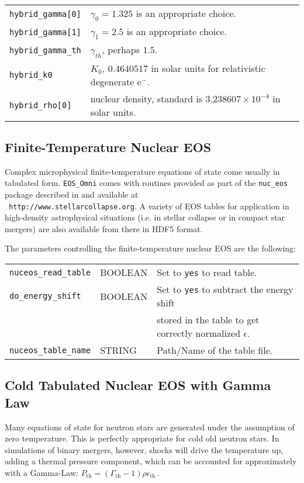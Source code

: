 \begin{tabular}{ll}
\texttt{hybrid\_gamma[0]}   & $\gamma_0 = 1.325$ is an appropriate choice.\\
\texttt{hybrid\_gamma[1]}   & $\gamma_1 = 2.5$ is an appropriate choice.\\
\texttt{hybrid\_gamma\_th}  & $\gamma_{th}$, perhaps $1.5$.\\
\texttt{hybrid\_k0}         & $K_0$, $0.4640517$ in solar units for
                              relativistic degenerate e$^{-}$.\\
\texttt{hybrid\_rho[0]}     & nuclear density, standard is $3.238607\times
                              10^{-4}$ in solar units.
\end{tabular}


\subsection{Finite-Temperature Nuclear EOS}

Complex microphysical finite-temperature equations of state come
usually in tabulated form. {\tt EOS\_Omni} comes with routines
provided as part of the \texttt{nuc\_eos} package described in
\cite{oconnor:10} and available at \\ {\tt
  http://www.stellarcollapse.org}. A variety of EOS tables for
application in high-density astrophysical situations (i.e. in stellar
collapse or in compact star mergers) are also available from there
in HDF5 format.

The parameters controlling the finite-temperature nuclear EOS
are the following:

\begin{tabular}{lll}
\texttt{nuceos\_read\_table}& BOOLEAN & Set to {\tt yes} to read table.\\
\texttt{do\_energy\_shift}& BOOLEAN & Set to {\tt yes} to subtract the energy shift\\ 
&& stored in the table to get correctly normalized $\epsilon$.\\
\texttt{nuceos\_table\_name}& STRING & Path/Name of the table file.
\end{tabular}

\subsection{Cold Tabulated Nuclear EOS with Gamma Law}

Many equations of state for neutron stars are generated under the
assumption of zero temperature. This is perfectly appropriate for cold
old neutron stars. In simulations of binary mergers, however, shocks
will drive the temperature up, adding a thermal pressure component,
which can be accounted for approximately with a Gamma-Law:
$P_{\mathrm{th}} = (\Gamma_{\mathrm{th}} - 1)\rho\epsilon_{\mathrm{th}}$\,.

